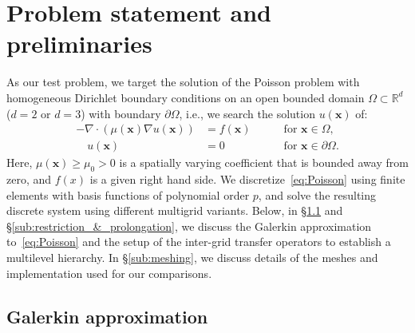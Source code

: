 \documentclass[smallcondensed,final]{svjour3}     %
\newcommand{\bs}[1]{\ensuremath{\boldsymbol #1}}
\begin{document}

\section{Problem statement and preliminaries}
\label{sec:problem}

As our test problem, we target the solution of the Poisson problem with
homogeneous Dirichlet boundary conditions on an open bounded domain
$\Omega\subset\mathbb R^d$ ($d=2$ or $d=3$) with boundary $\partial
\Omega$, i.e., we search the solution $u(\bs x)$ of:
\begin{equation}\label{eq:Poisson}
  \begin{aligned}
    -\nabla\cdot\left(\mu(\bs x)\nabla u(\bs x)\right) &= f(\bs x) \quad &&\text{ for } \bs x\in \Omega,\\
    \quad u(\bs x)& = 0  \quad &&\text{ for } \bs x\in \partial\Omega.
  \end{aligned}
\end{equation}
Here, $\mu(\bs x)\ge \mu_0>0$ is a spatially varying coefficient that
is bounded away from zero, and $f(x)$ is a given right hand side. We
discretize~\eqref{eq:Poisson} using finite elements with basis
functions of polynomial order $p$, and solve the resulting discrete
system using different multigrid variants. Below, in
\S\ref{subsec:galerkin} and \S\ref{sub:restriction_&_prolongation}, we
discuss the Galerkin approximation to~\eqref{eq:Poisson} and the setup
of the inter-grid transfer operators to establish a multilevel
hierarchy. In \S\ref{sub:meshing}, we discuss details of the meshes
and implementation used for our comparisons.

\subsection{Galerkin approximation} \label{subsec:galerkin}
\end{document}

